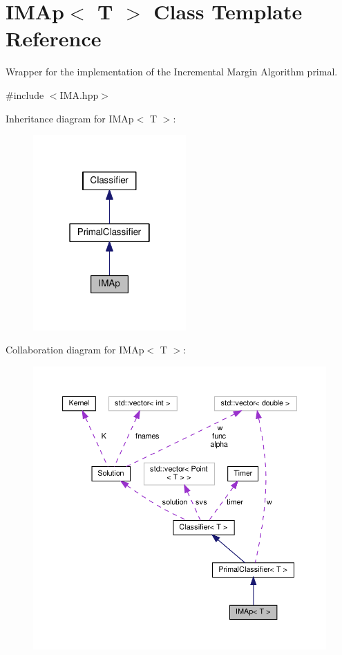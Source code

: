 \hypertarget{class_i_m_ap}{}\section{I\+M\+Ap$<$ T $>$ Class Template Reference}
\label{class_i_m_ap}


Wrapper for the implementation of the Incremental Margin Algorithm primal.  




{\ttfamily \#include $<$I\+M\+A.\+hpp$>$}



Inheritance diagram for I\+M\+Ap$<$ T $>$\+:\nopagebreak
\begin{figure}[H]
\begin{center}
\leavevmode
\includegraphics[width=166pt]{class_i_m_ap__inherit__graph}
\end{center}
\end{figure}


Collaboration diagram for I\+M\+Ap$<$ T $>$\+:
\nopagebreak
\begin{figure}[H]
\begin{center}
\leavevmode
\includegraphics[width=350pt]{class_i_m_ap__coll__graph}
\end{center}
\end{figure}
